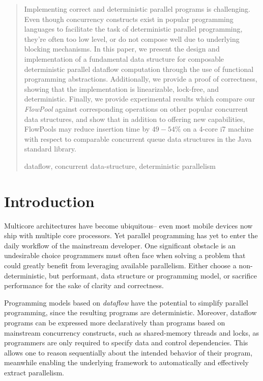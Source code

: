 \documentclass[runningheads,a4paper]{llncs}
\newcommand{\keywords}[1]{\par\addvspace\baselineskip
\noindent\keywordname\enspace\ignorespaces#1}
\begin{document}
\begin{abstract}
Implementing correct and deterministic parallel programs is challenging. Even
though concurrency constructs exist in popular programming languages to
facilitate the task of deterministic parallel programming, they're often too
low level, or do not compose well due to underlying blocking mechanisms. In
this paper, we present the design and implementation of a fundamental data
structure for composable deterministic parallel dataflow computation through
the use of functional programming abstractions. Additionally, we provide a
proof of correctness, showing that the implementation is linearizable,
lock-free, and deterministic. Finally, we provide experimental results which
compare our \emph{FlowPool} against corresponding operations on other popular
concurrent data structures, and show that in addition to offering new
capabilities, FlowPools may reduce insertion time by $49 - 54\%$ on a
4-core i7 machine with respect to comparable concurrent queue data
structures in the Java standard library.
\keywords{dataflow, concurrent data-structure, deterministic parallelism}
\end{abstract}


\section{Introduction}

Multicore architectures have become ubiquitous-- even most mobile devices now
ship with multiple core processors. Yet parallel programming has yet to enter
the daily workflow of the mainstream developer. One significant obstacle is an
undesirable choice programmers must often face when solving a problem that
could greatly benefit from leveraging available parallelism. Either choose a
non-deterministic, but performant, data structure or programming model, or
sacrifice performance for the sake of clarity and correctness.

Programming models based on \emph{dataflow} \cite{Arvind89,CnC10} have the
potential to simplify parallel programming, since the resulting programs are
deterministic. Moreover, dataflow programs can be expressed more declaratively
than programs based on mainstream concurrency constructs, such as shared-memory 
threads and locks, as programmers are only required to specify data and
control dependencies. This allows one to reason sequentially about the
intended behavior of their program, meanwhile enabling the underlying
framework to automatically and effectively extract parallelism.
\end{document}

